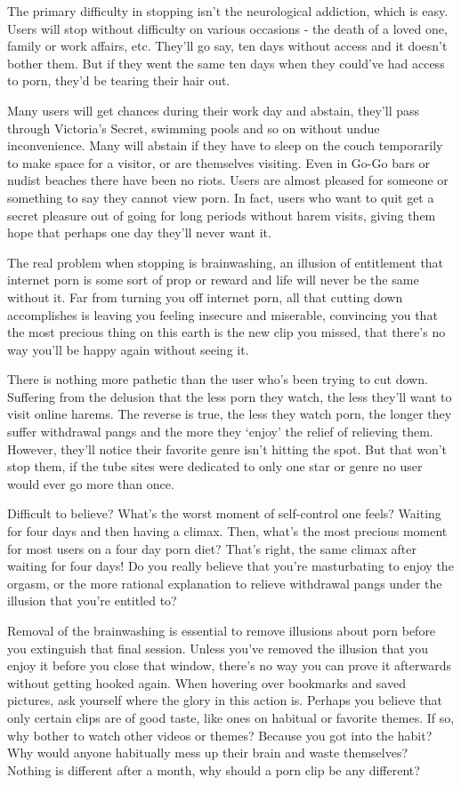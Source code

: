 \documentclass[
]{book}
\begin{document}
The primary difficulty in stopping isn't the neurological addiction, which is easy. Users will stop without difficulty on various occasions - the death of a loved one, family or work affairs, etc. They'll go say, ten days without access and it doesn't bother them. But if they went the same ten days when they could've had access to porn, they'd be tearing their hair out.

Many users will get chances during their work day and abstain, they'll pass through Victoria's Secret, swimming pools and so on without undue inconvenience. Many will abstain if they have to sleep on the couch temporarily to make space for a visitor, or are themselves visiting. Even in Go-Go bars or nudist beaches there have been no riots. Users are almost pleased for someone or something to say they cannot view porn. In fact, users who want to quit get a secret pleasure out of going for long periods without harem visits, giving them hope that perhaps one day they'll never want it.

The real problem when stopping is brainwashing, an illusion of entitlement that internet porn is some sort of prop or reward and life will never be the same without it. Far from turning you off internet porn, all that cutting down accomplishes is leaving you feeling insecure and miserable, convincing you that the most precious thing on this earth is the new clip you missed, that there's no way you'll be happy again without seeing it.

There is nothing more pathetic than the user who's been trying to cut down. Suffering from the delusion that the less porn they watch, the less they'll want to visit online harems. The reverse is true, the less they watch porn, the longer they suffer withdrawal pangs and the more they `enjoy' the relief of relieving them. However, they'll notice their favorite genre isn't hitting the spot. But that won't stop them, if the tube sites were dedicated to only one star or genre no user would ever go more than once.

Difficult to believe? What's the worst moment of self-control one feels? Waiting for four days and then having a climax. Then, what's the most precious moment for most users on a four day porn diet? That's right, the same climax after waiting for four days! Do you really believe that you're masturbating to enjoy the orgasm, or the more rational explanation to relieve withdrawal pangs under the illusion that you're entitled to?

Removal of the brainwashing is essential to remove illusions about porn before you extinguish that final session. Unless you've removed the illusion that you enjoy it before you close that window, there's no way you can prove it afterwards without getting hooked again. When hovering over bookmarks and saved pictures, ask yourself where the glory in this action is. Perhaps you believe that only certain clips are of good taste, like ones on habitual or favorite themes. If so, why bother to watch other videos or themes? Because you got into the habit? Why would anyone habitually mess up their brain and waste themselves? Nothing is different after a month, why should a porn clip be any different?
\end{document}
